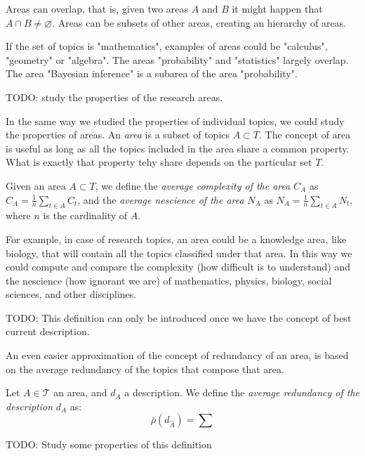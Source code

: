 Areas can overlap, that is, given two areas $A$ and $B$ it might happen that $A \cap B \neq \varnothing$. Areas can be subsets of other areas, creating an hierarchy of areas.

\begin{example}
If the set of topics is "mathematics", examples of areas could be "calculus", "geometry" or "algebra". The areas "probability" and "statistics" largely overlap. The area "Bayesian inference" is a subarea of the area "probability".
\end{example}

{\color{red} TODO: study the properties of the research areas.}

In the same way we studied the properties of individual topics, we could study the properties of areas. An \emph{area} is a subset of topics $A\subset T$. The concept of area is useful as long as all the topics included in the area share a common property. What is exactly that property tehy share depends on the particular set $T$.

\begin{definition}
Given an area $A\subset T$, we define the \emph{average complexity of the area} $C_{A}$ as $C_{A}=\frac{1}{n}\sum_{t\in A}C_{t}$, and the \emph{average nescience of the area} $N_{A}$ as $N_{A}=\frac{1}{n}\sum_{t\in A}N_{t}$, where $n$ is the cardinality of $A$.
\end{definition}

For example, in case of research topics, an area could be a knowledge area, like biology, that will contain all the topics classified under that area. In this way we could compute and compare the complexity (how difficult is to understand) and the nescience (how ignorant we are) of mathematics, physics, biology, social sciences, and other disciplines.

{\color{red} TODO: This definition can only be introduced once we have the concept of best current description.}

An even easier approximation of the concept of redundancy of an area, is based on the average redundancy of the topics that compose that area.

\begin{definition}
Let $A \in \mathcal{T}$ an area, and $d_A$ a description. We define the \emph{average redundancy of the description} $d_A$ as:
\[
\bar{\rho}(d_{\hat{A}}) = \sum
\]
\end{definition}

{\color{red} TODO: Study some properties of this definition}

